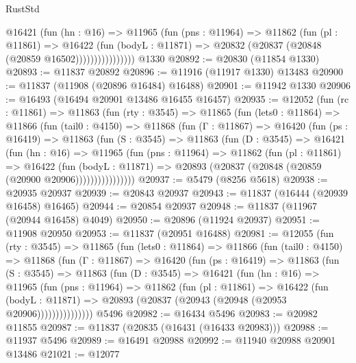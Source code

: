 \begin{lexlean}{RustStd}
\begin{coremodule}
{\begin{coremodule}
{{{{{{{{{{{{{{{{{{{{{{{{{{{{{{{{{{{{{{{{{{{{{{{{{{                    @16421
                      (fun (hn : @16) =>
                      @11965
                        (fun (pns : @11964) =>
                        @11862
                          (fun (pl : @11861) =>
                          @16422
                            (fun (bodyL : @11871) =>
                            @20832 (@20837 (@20848 (@20859 @16502))))))))))))))))
    @1330
@20892 := @20830 (@11854 @1330)
@20893 := @11837 @20892
@20896 := @11916 (@11917 @1330) @13483
@20900 := @11837 (@11908 (@20896 @16484) @16488)
@20901 := @11942 @1330
@20906 := @16493 (@16494 @20901 @13486 @16455 @16457)
@20935 := @12052
    (fun (rc : @11861) =>
    @11863
      (fun (rty : @3545) =>
      @11865
        (fun (lets0 : @11864) =>
        @11866
          (fun (tail0 : @4150) =>
          @11868
            (fun (Γ : @11867) =>
            @16420
              (fun (ps : @16419) =>
              @11863
                (fun (S : @3545) =>
                @11863
                  (fun (D : @3545) =>
                  @16421
                    (fun (hn : @16) =>
                    @11965
                      (fun (pns : @11964) =>
                      @11862
                        (fun (pl : @11861) =>
                        @16422
                          (fun (bodyL : @11871) =>
                          @20893 (@20837 (@20848 (@20859 (@20900 @20906))))))))))))))))
@20937 := @5479 (@8256 @5618)
@20938 := @20935 @20937
@20939 := @20843 @20937
@20943 := @11837 (@16444 (@20939 @16458) @16465)
@20944 := @20854 @20937
@20948 := @11837 (@11967 (@20944 @16458) @4049)
@20950 := @20896 (@11924 @20937)
@20951 := @11908 @20950
@20953 := @11837 (@20951 @16488)
@20981 := @12055
    (fun (rty : @3545) =>
    @11865
      (fun (lets0 : @11864) =>
      @11866
        (fun (tail0 : @4150) =>
        @11868
          (fun (Γ : @11867) =>
          @16420
            (fun (ps : @16419) =>
            @11863
              (fun (S : @3545) =>
              @11863
                (fun (D : @3545) =>
                @16421
                  (fun (hn : @16) =>
                  @11965
                    (fun (pns : @11964) =>
                    @11862
                      (fun (pl : @11861) =>
                      @16422
                        (fun (bodyL : @11871) =>
                        @20893 (@20837 (@20943 (@20948 (@20953 @20906)))))))))))))))
    @5496
@20982 := @16434 @5496
@20983 := @20982 @11855
@20987 := @11837 (@20835 (@16431 (@16433 @20983)))
@20988 := @11937 @5496
@20989 := @16491 @20988
@20992 := @11940 @20988 @20901 @13486
@21021 := @12077
}}}}}}}}}}}}}}}}}}}}}}}}}}}}}}}}}}}}}}}}}}}}}}}}}}
\end{coremodule}}
\end{coremodule}
\end{lexlean}

